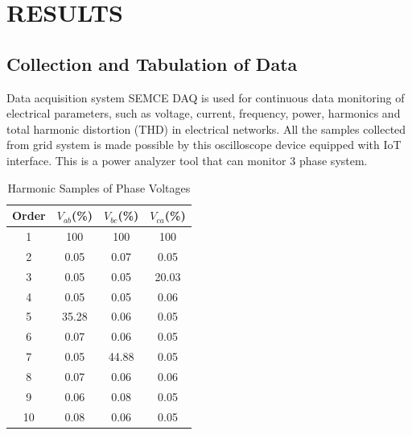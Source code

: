 \documentclass[a4paper,12pt,oneside]{book}
\begin{document}
\chapter{RESULTS} \label{chap:result}
\label{sec:results}

\section{Collection and Tabulation of Data}
Data acquisition system SEMCE DAQ is used for continuous data monitoring of electrical parameters, such as voltage, current, frequency, power, harmonics and total harmonic distortion (THD) in electrical networks\cite{6563537}. 
All the samples collected from grid system is made possible by this oscilloscope device equipped with IoT interface. This is a power analyzer tool that can monitor 3 phase system.

\begin{table}[ht]
  \centering
  \caption{Harmonic Samples of Phase Voltages\cite{6563537}}
  \begin{tabular}{|c|c|c|c|}
  \hline
  \textbf{Order} & \textbf{$V_{ab}$(\%)} & \textbf{$V_{bc}$(\%)} & \textbf{$V_{ca}$(\%)} \\
  \hline
  1 & 100 & 100 & 100 \\
  2 & 0.05 & 0.07 & 0.05 \\
  3 & 0.05 & 0.05 & 20.03 \\
  4 & 0.05 & 0.05 & 0.06 \\
  5 & 35.28 & 0.06 & 0.05 \\
  6 & 0.07 & 0.06 & 0.05 \\
  7 & 0.05 & 44.88 & 0.05 \\
  8 & 0.07 & 0.06 & 0.06 \\
  9 & 0.06 & 0.08 & 0.05 \\
  10 & 0.08 & 0.06 & 0.05 \\
  \hline
  \end{tabular}
  \label{tab:harmonic-samples-voltage}
  \end{table}
\end{document}
